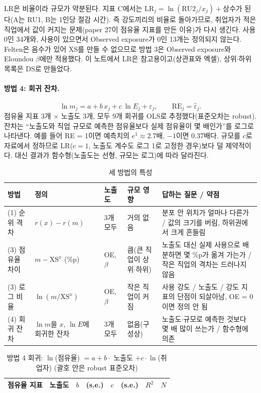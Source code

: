 \documentclass[11pt]{article}
\begin{document}
LR은 비율이라 규모가 약분된다. 지표 C에서는 $\mathrm{LR}_j = \ln(\mathrm{RU2}_j / x_j) + \text{상수}$가 된다(A는 RU1, B는 1인당 절감 시간). 즉 강도끼리의 비율로 돌아가므로, 취업자가 적은 직업에서 값이 커지는 문제(paper 27이 점유율 지표를 만든 이유)가 다시 생긴다. 사용 0인 34개와, 사용이 있으면서 Observed exposure가 0인 13개는 정의되지 않는다. Felten은 음수가 있어 XS를 만들 수 없으므로 방법 3은 Observed exposure와 Eloundou $\beta$에만 적용했다. 이 노트에서 LR은 참고용이고(상관표와 엑셀), 상위$\cdot$하위 목록은 DS로 만들었다.

\paragraph{방법 4: 회귀 잔차.}
\[
  \ln m_j = a + b\,x_j + c\,\ln E_j + \varepsilon_j, \qquad \mathrm{RE}_j = \hat{\varepsilon}_j.
\]
점유율 지표 3개 $\times$ 노출도 3개, 모두 9개 회귀를 OLS로 추정했다(표준오차는 robust). 잔차는 ``노출도와 직업 규모로 예측한 점유율보다 실제 점유율이 몇 배인가''를 로그로 나타낸다. 예를 들어 RE = 1이면 예측치의 $e^1 \approx 2.7$배, $-1$이면 0.37배다. 규모를 $c$로 자료에서 정하므로 LR($c = 1$, 노출도 계수도 로그 1로 고정한 경우)보다 덜 제약적이다. 대신 결과가 함수형(노출도는 선형, 규모는 로그)에 따라 달라진다.

\begin{longtable}{L{2.4cm}L{3.6cm}L{2.0cm}L{2.0cm}L{6.2cm}}
\caption{세 방법의 특성}\label{tab:methods}\\
\toprule
방법 & 정의 & 노출도 & 규모 영향 & 답하는 질문 / 약점 \\
\midrule
\endfirsthead
(1) 순위 격차 & $r(x) - r(m)$ & 3개 모두 & 거의 없음 & 분포 안 위치가 얼마나 다른가 / 값의 크기를 버림, 하위권에서 크게 흔들림 \\
(3) 점유율 차이 & $m - \mathrm{XS}^x$ (\%p) & OE, $\beta$ & 큼(큰 직업이 상위$\cdot$하위) & 노출도 대신 실제 사용으로 배분하면 몇 \%p가 옮겨 가는가 / 작은 직업의 격차는 드러나지 않음 \\
(3) 로그 비율 & $\ln(m / \mathrm{XS}^x)$ & OE, $\beta$ & 작은 직업이 커짐 & 사용 강도 / 노출도 / 강도 지표의 단점이 되살아남, OE = 0이면 정의 안 됨 \\
(4) 회귀 잔차 & $\ln m$을 $x$, $\ln E$에 회귀한 잔차 & 3개 모두 & 없음(구성상) & 노출도$\cdot$규모로 예측한 것보다 몇 배 많이 쓰는가 / 함수형에 의존 \\
\bottomrule
\end{longtable}

\begin{longtable}{L{3.4cm}L{3.4cm}R{1.4cm}R{1.4cm}R{1.6cm}R{1.4cm}R{1.0cm}R{0.8cm}}
\caption{방법 4 회귀: $\ln$(점유율) $= a + b \cdot$ 노출도 $+ c \cdot \ln$(취업자) (괄호 안은 robust 표준오차)}\label{tab:reg}\\
\toprule
점유율 지표 & 노출도 & $b$ & (s.e.) & $c$ & (s.e.) & $R^2$ & $N$ \\
\midrule
\endfirsthead

\bottomrule
\end{longtable}
\end{document}
